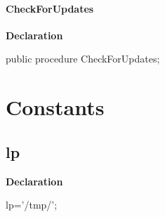 \documentclass{report}
\newif\ifpdf
\begin{document}
\paragraph*{CheckForUpdates}\hspace*{\fill}

\label{mnupdate.TForm1-CheckForUpdates}
\begin{list}{}{
\setlength{\itemindent}{0cm}
\setlength{\listparindent}{0cm}
\setlength{\leftmargin}{\evensidemargin}
\addtolength{\leftmargin}{\tmplength}
\settowidth{\labelsep}{X}
\addtolength{\leftmargin}{\labelsep}
\setlength{\labelwidth}{\tmplength}
}
\item[\textbf{Declaration}\hfill]
\ifpdf
\begin{flushleft}
\fi
\begin{ttfamily}
public procedure CheckForUpdates;\end{ttfamily}

\ifpdf
\end{flushleft}
\fi

\end{list}
\section{Constants}
\ifpdf
\subsection*{\large{\textbf{lp}}\normalsize\hspace{1ex}\hrulefill}
\else
\subsection*{lp}
\fi
\label{mnupdate-lp}
\begin{list}{}{
\setlength{\itemindent}{0cm}
\setlength{\listparindent}{0cm}
\setlength{\leftmargin}{\evensidemargin}
\addtolength{\leftmargin}{\tmplength}
\settowidth{\labelsep}{X}
\addtolength{\leftmargin}{\labelsep}
\setlength{\labelwidth}{\tmplength}
}
\item[\textbf{Declaration}\hfill]
\ifpdf
\begin{flushleft}
\fi
\begin{ttfamily}
lp='/tmp/';\end{ttfamily}

\ifpdf
\end{flushleft}
\fi

\end{list}
\end{document}

